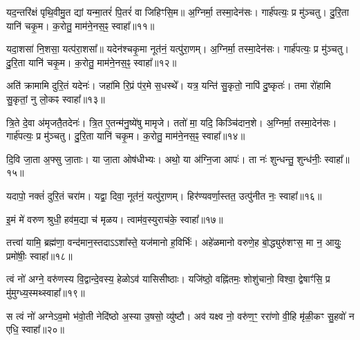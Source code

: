 

यद॒न्तरि॑क्षं पृथि॒वीमु॒त द्यां यन्मा॒तरं॑ पि॒तरं॑ वा जिहिꣳसि॒म॥
अ॒ग्निर्मा॒ तस्मा॒देन॑सः। गार्\mbox{}ह॑पत्यः॒ प्र मु॑ञ्चतु। 
दु॒रि॒ता यानि॑ चकृ॒म। क॒रोतु॒ माम॑ने॒नस॒ꣴ॒ स्वाहा᳚॥११॥




यदा॒शसा॑ नि॒शसा॒ यत्प॑रा॒शसा᳚॥ यदेन॑श्चकृ॒मा नूत॑नं॒ यत्पु॑रा॒णम्।
अ॒ग्निर्मा॒ तस्मा॒देन॑सः। गार्\mbox{}ह॑पत्यः॒ प्र मु॑ञ्चतु। 
दु॒रि॒ता यानि॑ चकृ॒म। क॒रोतु॒ माम॑ने॒नस॒ꣴ॒ स्वाहा᳚॥१२॥




अति॑ क्रामामि दुरि॒तं यदेनः॑। जहा॑मि रि॒प्रं प॑र॒मे स॒धस्थे᳚।
यत्र॒ यन्ति॑ सु॒कृतो॒ नापि॑ दु॒ष्कृतः॑।
तमा रो॑हामि सु॒कृतां॒ नु लो॒कꣴ स्वाहा᳚॥१३॥


त्रि॒ते दे॒वा अ॑मृजतै॒तदेनः॑।
त्रि॒त ए॒तन्म॑नु॒ष्ये॑षु मामृजे।
ततो॑ मा॒ यदि॒ किञ्चि॑दान॒शे।
अ॒ग्निर्मा॒ तस्मा॒देन॑सः। गार्\mbox{}ह॑पत्यः॒ प्र मु॑ञ्चतु। 
दु॒रि॒ता यानि॑ चकृ॒म। क॒रोतु॒ माम॑ने॒नस॒ꣴ॒ स्वाहा᳚॥१४॥


दि॒वि जा॒ता अ॒फ्सु जा॒ताः।
या जा॒ता ओष॑धीभ्यः।
अथो॒ या अ॑ग्नि॒जा आपः॑।
ता नः॑ शुन्धन्तु॒ शुन्ध॑नीः॒ स्वाहा᳚॥१५॥


यदापो॒ नक्तं॑ दुरि॒तं चरा॑म।
यद्वा॒ दिवा॒ नूत॑नं॒ यत्पु॑रा॒णम्।
हिर॑ण्यवर्णा॒स्तत॒ उत्पु॑नीत नः॒ स्वाहा᳚॥१६॥



इ॒मं मे॑ वरुण श्रुधी॒ हव॑म॒द्या च॑ मृळय। त्वाम॑व॒स्युराच॑के॒ स्वाहा᳚॥१७॥


तत्त्वा॑ यामि॒ ब्रह्म॑णा॒ वन्द॑मान॒स्तदाऽऽशा᳚स्ते॒ यज॑मानो ह॒विर्भिः॑।
अहे॑ळमानो वरुणे॒ह बो॒द्ध्युरु॑शꣳस॒ मा न॒ आयुः॒ प्रमो॑षीः॒ स्वाहा᳚॥१८॥



त्वं नो॑ अग्ने॒ वरु॑णस्य वि॒द्वान्दे॒वस्य॒ हेळो\-ऽव॑ यासिसीष्ठाः।
यजि॑ष्ठो॒ वह्नि॑तमः॒ शोशु॑चानो॒ विश्वा॒ द्वेषाꣳ॑सि॒ प्र मु॑मुग्ध्य॒स्मथ्स्वाहा᳚॥१९॥




स त्वं नो॑ अग्ने\-ऽव॒मो भ॑वो॒ती नेदि॑ष्ठो अ॒स्या उ॒षसो॒ व्यु॑ष्टौ।
अव॑ यक्ष्व नो॒ वरु॑ण॒ꣳ॒ ररा॑णो वी॒हि मृ॑ळी॒कꣳ सु॒हवो॑ न एधि॒ स्वाहा᳚॥२०॥

